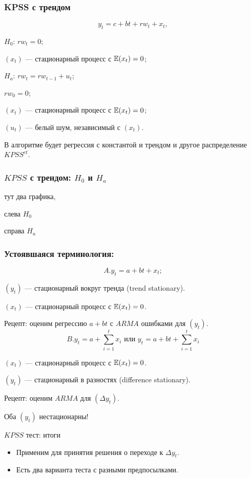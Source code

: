   
  \begin{frame}
    \frametitle{KPSS с трендом}
    \[
      y_t = c + bt + rw_t + x_t,
    \]
  
    \pause
  
    \alert{$H_0$: $rw_t = 0$};
    
    $(x_t)$ — стационарный процесс с $\mathbb{E}(x_t) = 0$;
    
    \pause
  
    \alert{$H_a$: $rw_t = rw_{t-1} + u_t$};

    $rw_0 = 0$;
  
    $(x_t)$ — стационарный процесс с $\mathbb{E}(x_t) = 0$;

    $(u_t)$ — белый шум, независимый с $(x_t)$.
  
    \pause 
  
    В алгоритме будет регрессия \alert{с константой и трендом} и другое распределение $KPSS^{ct}$.
  
  \end{frame}
  
  
  \begin{frame}
    \frametitle{$KPSS$ с трендом: $H_0$ и $H_a$}
  
  
    тут два графика,
  
  
    слева $H_0$
  
  
    справа $H_a$
  
  
  \end{frame}
  

  \begin{frame}
    \frametitle{Устоявшаяся терминология:}
    \[
      A. y_t = a + bt + x_t;
    \]

    $(y_t)$ — \alert{стационарный вокруг тренда} (trend stationary).

    $(x_t)$ — стационарный процесс с $\mathbb{E}(x_t) = 0$.

    \pause Рецепт: оценим регрессию $a + bt$ с $ARMA$ ошибками для $(y_t)$.
    \pause 
    \[
      B. y_t = a + \sum_{i=1}^t x_i \text{ или } y_t = a + bt + \sum_{i=1}^t x_i
    \]

    $(x_t)$ — стационарный процесс с $\mathbb{E}(x_t) = 0$.

    $(y_t)$ — \alert{стационарный в разностях} (difference stationary).

    \pause Рецепт: оценим $ARMA$ для $(\Delta y_t)$.

    \pause Оба $(y_t)$ нестационарны!
    
  \end{frame}


  
  \begin{frame}{$KPSS$ тест: итоги}
  
    \begin{itemize}[<+->]
      \item Применим для принятия решения о переходе к $\Delta y_t$.
      \item Есть два варианта теста с разными предпосылками.
    \end{itemize}
  \end{frame}
  
  
  
  